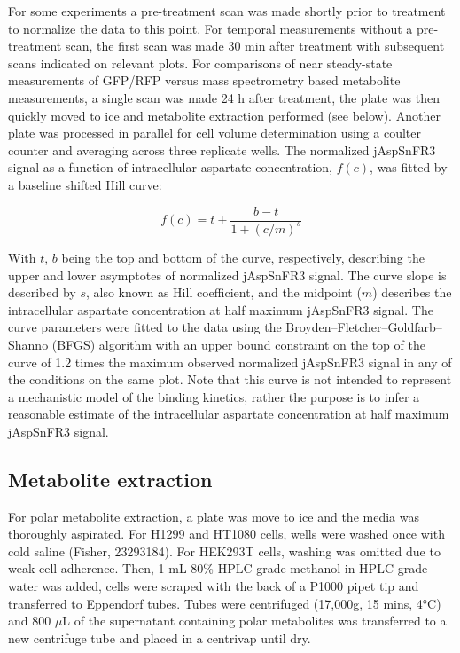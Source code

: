 For some experiments a pre-treatment scan was made shortly prior to treatment to normalize the data to this point.
For temporal measurements without a pre-treatment scan, the first scan was made 30 min after treatment with subsequent scans indicated on relevant plots.
For comparisons of near steady-state measurements of GFP/RFP versus mass spectrometry based metabolite measurements, a single scan was made 24 h after treatment, the plate was then quickly moved to ice and metabolite extraction performed (see below).
Another plate was processed in parallel for cell volume determination using a coulter counter and averaging across three replicate wells.
The normalized jAspSnFR3 signal as a function of intracellular aspartate concentration, $f(c)$, was fitted by a baseline shifted Hill curve:

$$
f(c) = t + \frac{b - t}{1 + (c/m)^s}
$$

With $t$, $b$ being the top and bottom of the curve, respectively, describing the upper and lower asymptotes of normalized jAspSnFR3 signal.
The curve slope is described by $s$, also known as Hill coefficient, and the midpoint ($m$) describes the intracellular aspartate concentration at half maximum jAspSnFR3 signal.
The curve parameters were fitted to the data using the Broyden–Fletcher–Goldfarb–Shanno (BFGS) algorithm with an upper bound constraint on the top of the curve of 1.2 times the maximum observed normalized jAspSnFR3 signal in any of the conditions on the same plot.
Note that this curve is not intended to represent a mechanistic model of the binding kinetics, rather the purpose is to infer a reasonable estimate of the intracellular aspartate concentration at half maximum jAspSnFR3 signal.

\subsection{Metabolite extraction}
For polar metabolite extraction, a plate was move to ice and the media was thoroughly aspirated.
For H1299 and HT1080 cells, wells were washed once with cold saline (Fisher, 23293184).
For HEK293T cells, washing was omitted due to weak cell adherence.
Then, 1 mL 80\% HPLC grade methanol in HPLC grade water was added, cells were scraped with the back of a P1000 pipet tip and transferred to Eppendorf tubes.
Tubes were centrifuged (17,000g, 15 mins, 4°C) and 800 $\mu$L of the supernatant containing polar metabolites was transferred to a new centrifuge tube and placed in a centrivap until dry.

